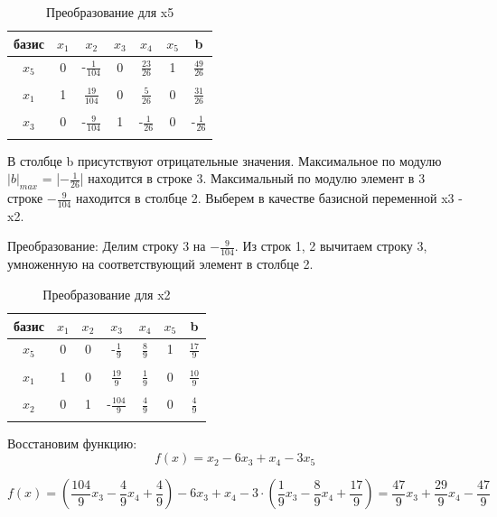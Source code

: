 \documentclass{article}
\begin{document}
\begin{table}[H]
    \centering
    \caption{Преобразование для x5}
    \begin{tabular}{|c|c|c|c|c|c|c|}
    \hline
        базис & $x_1$ & $x_2$ & $x_3$ & $x_4$ & $x_5$ & b \\ \hline
        $x_5$ & 0	&-$\frac{1}{104}$&	0	&$\frac{23}{26}$&	1	&$\frac{49}{26}$ \\
          &	&&	&&		&\\\hline
        $x_1$ & 1	&$\frac{19}{104}$&	0	&$\frac{5}{26}$	&0&	$\frac{31}{26}$ \\
        &	&&	&&		&\\\hline
        $x_3$  & 0&-$\frac{9}{104}$	&1	&-$\frac{1}{26}$&0	&-$\frac{1}{26}$ \\ 
        &	&&	&&		&\\\hline
    \end{tabular}
\end{table}
В столбце b присутствуют отрицательные значения.
Максимальное по модулю $|b|_{max}$ = |$-\frac{1}{26}$| находится в строке 3.
Максимальный по модулю элемент в 3 строке $-\frac{9}{104}$ находится в столбце 2.
Выберем в качестве базисной переменной x3 - x2.

Преобразование: Делим строку 3 на $-\frac{9}{104}$. 
Из строк 1, 2 вычитаем строку 3, умноженную на соответствующий элемент в столбце 2.
\begin{table}[H]
    \centering
    \caption{Преобразование для x2}
    \begin{tabular}{|c|c|c|c|c|c|c|}
    \hline
        базис & $x_1$ & $x_2$ & $x_3$ & $x_4$ & $x_5$ & b \\ \hline
        $x_5$ & 0	&0&	-$\frac{1}{9}$	&$\frac{8}{9}$&	1	&$\frac{17}{9}$ \\
          &	&&	&&		&\\\hline
        $x_1$ & 1	&0&	$\frac{19}{9}$	&$\frac{1}{9}$	&0&	$\frac{10}{9}$ \\
        &	&&	&&		&\\\hline
        $x_2$  & 0&1	&-$\frac{104}{9}$	&$\frac{4}{9}$&0	&$\frac{4}{9}$ \\ 
        &	&&	&&		&\\\hline
    \end{tabular}
\end{table}

Восстановим функцию:
\[f(x) = x_2-6x_3+x_4-3x_5\]

\[f(x) = (\frac{104}{9}x_3 - \frac{4}{9}x_4 + \frac{4}{9})-6x_3+x_4-3\cdot (\frac{1}{9}x_3 - \frac{8}{9}x_4 + \frac{17}{9}) = \frac{47}{9}x_3+\frac{29}{9}x_4-\frac{47}{9}\]
\end{document}
